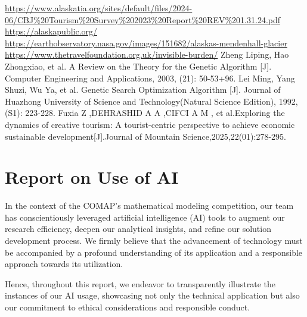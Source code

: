 \documentclass{mcmthesis}
\begin{document}
\newpage
\begin{thebibliography}{99}
  \url{https://www.alaskatia.org/sites/default/files/2024-06/CBJ%20Tourism%20Survey%202023%20Report%20REV%201.31.24.pdf}
  \url{https://alaskapublic.org/}
  \url{https://earthobservatory.nasa.gov/images/151682/alaskas-mendenhall-glacier}
  \url{https://www.thetravelfoundation.org.uk/invisible-burden/}
  Zheng Liping, Hao Zhongxiao, et al. A Review on the Theory for the Genetic Algorithm [J]. Computer Engineering and Applications, 2003, (21): 50-53+96.
  Lei Ming, Yang Shuzi, Wu Ya, et al. Genetic Search Optimization Algorithm [J]. Journal of Huazhong University of Science and Technology(Natural Science Edition), 1992, (S1): 223-228.
  Fuxia Z ,DEHRASHID A A ,CIFCI A M , et al.Exploring the dynamics of creative tourism: A tourist-centric perspective to achieve economic sustainable development[J].Journal of Mountain Science,2025,22(01):278-295.
\end{thebibliography}


\newpage
\section{Report on Use of AI}
{In the context of the COMAP's mathematical modeling competition, our team has conscientiously leveraged artificial intelligence (AI) tools to augment our research efficiency, deepen our analytical insights, and refine our solution development process. We firmly believe that the advancement of technology must be accompanied by a profound understanding of its application and a responsible approach towards its utilization.}

{Hence, throughout this report, we endeavor to transparently illustrate the instances of our AI usage, showcasing not only the technical application but also our commitment to ethical considerations and responsible conduct.}
\end{document}
